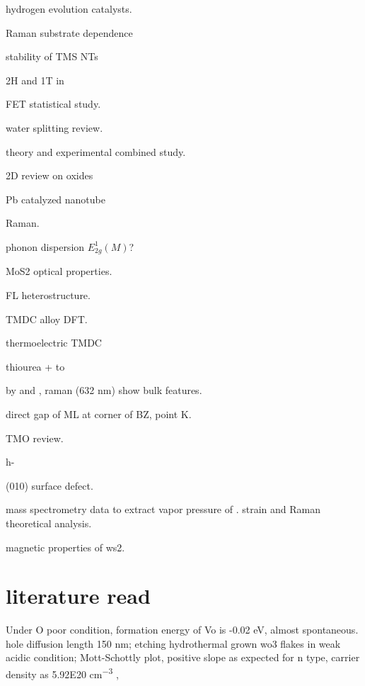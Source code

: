 hydrogen evolution catalysts. \cite{Merki2011}

Raman substrate dependence \cite{Buscema2013}

stability of TMS NTs \cite{Seifert2002}

2H and 1T in  \cite{Eda2012}

 FET statistical study. \cite{Liu2013i}

water splitting review. \cite{B800489G}

 theory and experimental combined study. \cite{Klein2001}

2D review on oxides \cite{Osada2012}

Pb catalyzed  nanotube \cite{Brontvein2012}

 Raman.\cite{Zhao2013} \cite{Sekine1980}

phonon dispersion $E_{2g}^1(M)$? \cite{Ataca2012}

MoS2 optical properties.\cite{Search1979}

FL heterostructure. \cite{Yu2013a}

\cite{Kang2013} TMDC alloy DFT.

thermoelectric TMDC \cite{Wickramaratne2014}

 thiourea +  to  \cite{Leonard-Deepak2011}

 by  and , raman (632 nm) show bulk features\cite{Tenne2008}.

direct gap of ML at corner of BZ, point K.

TMO review.\cite{Goodenough2013}

h- \cite{Lunk2010} \cite{Zheng2009}

 (010) surface defect. \cite{Chen2001}

mass spectrometry data to extract vapor pressure of .
strain and Raman theoretical analysis.\cite{Chang2013a} 

magnetic properties of ws2.\cite{Zhang2013j} 


\section{literature read}

Under O poor condition, formation energy of Vo is -0.02 eV, almost spontaneous.  hole diffusion length 150 nm; etching hydrothermal grown wo3 flakes in weak acidic condition; Mott-Schottly plot, positive slope as expected for n type, carrier density as 5.92E20 \si{cm^{-3}} \cite{Li2014g}, 

